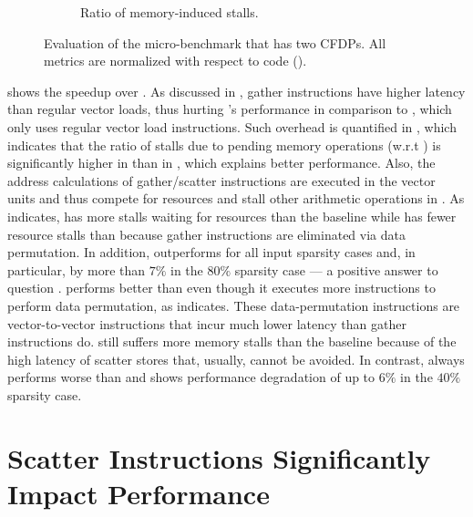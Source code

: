 \begin{figure}[htbp]
\begin{subfigure}{.49\textwidth}
    \caption{Ratio of memory-induced stalls.}
    \label{fig:if-then-else-many-scatter-mem-stalls}
  \end{subfigure}%
  \caption{Evaluation of the \ifElseBench micro-benchmark that has two CFDPs. All metrics are normalized with respect to \ifconverted code (\ifconv).}
\end{figure}


 shows the speedup over \ifconv.
As discussed in , gather instructions have higher latency than regular vector loads, thus hurting \ALC's performance in comparison to \ifconv, which only uses regular vector load instructions.
Such overhead is quantified in , which indicates that the ratio of stalls due to pending memory operations (w.r.t \ifconv) is significantly higher in \ALC than in \ALCdp, which explains \ALCdp better performance.
Also, the address calculations of gather/scatter instructions are executed in the vector units and thus compete for resources and stall other arithmetic operations in \ifElseBench.
As  indicates, \ALC has more stalls waiting for resources than the baseline \ifconv while \ALCdp has fewer resource stalls than \ALC because gather instructions are eliminated via data permutation.
In addition, \ALCdp outperforms \ifconv for all input sparsity cases and, in particular, by more than $7\%$ in the $80\%$ sparsity case --- a positive answer to question .
\ALCdp performs better than \ifconv even though it executes more instructions to perform data permutation,  as  indicates.
These data-permutation instructions are vector-to-vector instructions that incur much lower latency than gather instructions do.
\ALCdp still suffers more memory stalls than the baseline \ifconv because of the high latency of scatter stores that, usually, cannot be avoided.
In contrast,  \ALC always performs worse than \ifconv and shows performance degradation of up to $6\%$ in the $40\%$ sparsity case.

\section{Scatter Instructions Significantly Impact Performance}
\label{sec:eval-scatters-costs}


